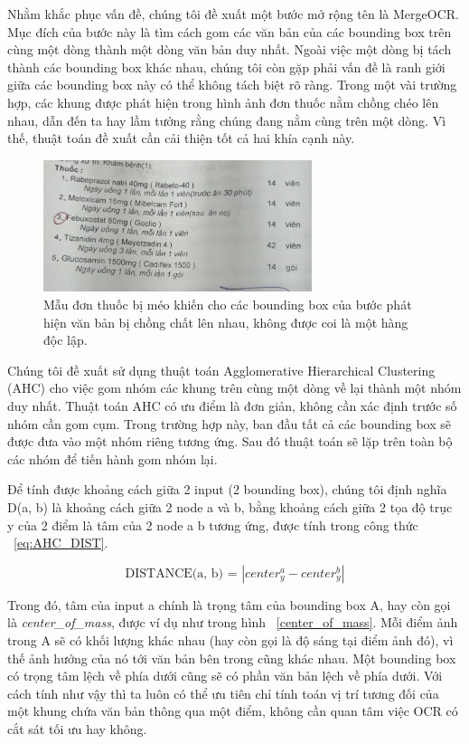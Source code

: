 Nhằm khắc phục vấn đề, chúng tôi đề xuất một bước mở rộng tên là MergeOCR. Mục đích của bước này là tìm cách gom các văn bản của các bounding box trên cùng một dòng thành một dòng văn bản duy nhất. Ngoài việc một dòng bị tách thành các bounding box khác nhau, chúng tôi còn gặp phải vấn đề là ranh giới giữa các bounding box này có thể không tách biệt rõ ràng. Trong một vài trường hợp, các khung được phát hiện trong hình ảnh đơn thuốc nằm chồng chéo lên nhau, dẫn đến ta hay lầm tưởng rằng chúng đang nằm cùng trên một dòng. Vì thế, thuật toán đề xuất cần cải thiện tốt cả hai khía cạnh này.

\begin{figure}
\centering
\includegraphics[width=0.7\textwidth]{mep_img/mergeocr_1.png}
\caption{Mẫu đơn thuốc bị méo khiến cho các bounding box của bước phát hiện văn bản bị chồng chất lên nhau, không được coi là một hàng độc lập.}\label{mergeocr_1}
\end{figure}

Chúng tôi đề xuất sử dụng thuật toán Agglomerative Hierarchical Clustering (AHC) cho việc gom nhóm các khung trên cùng một dòng về lại thành một nhóm duy nhất. Thuật toán AHC có ưu điểm là đơn giản, không cần xác định trước số nhóm cần gom cụm. Trong trường hợp này, ban đầu tất cả các bounding box sẽ được đưa vào một nhóm riêng tương ứng. Sau đó thuật toán sẽ lặp trên toàn bộ các nhóm để tiến hành gom nhóm lại. 

Để tính được khoảng cách giữa 2 input (2 bounding box), chúng tôi định nghĩa D(a, b) là khoảng cách giữa 2 node a và b, bằng khoảng cách giữa 2 tọa độ trục y của 2 điểm là tâm của 2 node a b tương ứng, được tính trong công thức ~\ref{eq:AHC_DIST}.

\begin{dmath}
    \label{eq:AHC_DIST}
    \text{DISTANCE(a, b) = } | center_y^a - center_y^b |
\end{dmath}

Trong đó, tâm của input a chính là trọng tâm của bounding box A, hay còn gọi là \textit{center_of_mass}, được ví dụ như trong hình ~\ref{center_of_mass}. Mỗi điểm ảnh trong A sẽ có khối lượng khác nhau (hay còn gọi là độ sáng tại điểm ảnh đó), vì thế ảnh hưởng của nó tới văn bản bên trong cũng khác nhau. Một bounding box có trọng tâm lệch về phía dưới cũng sẽ có phần văn bản lệch về phía dưới. Với cách tính như vậy thì ta luôn có thể ưu tiên chỉ tính toán vị trí tương đối của một khung chứa văn bản thông qua một điểm, không cần quan tâm việc OCR có cắt sát tối ưu hay không. 

